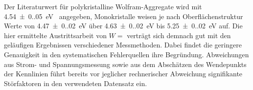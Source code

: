 Der Literaturwert für polykristalline Wolfram-Aggregate wird mit \qty{4.54(0.05)}{\electronvolt}~\cite{hop_riv_work_function}
angegeben, Monokristalle weisen je nach Oberflächenstruktur Werte von \qty{4.47(0.02)}{\electronvolt} über
\qty{4.63(0.02)}{\electronvolt} bis \qty{5.25(0.02)}{\electronvolt} \cite{str_mac_swa_work_function} auf.
Die hier ermittelte Austrittsarbeit von $W = $ verträgt sich demnach gut mit den geläufigen
Ergebnissen verschiedener Messmethoden. Dabei findet die geringere Genauigkeit in den systematischen
Fehlerquellen ihre Begründung. Abweichungen aus Strom- und Spannungsmessung sowie aus dem Abschätzen des Wendepunkts der
Kennlinien führt bereits vor jeglicher rechnerischer Abweichung signifikante Störfaktoren in den verwendeten Datensatz ein.

\vfill
